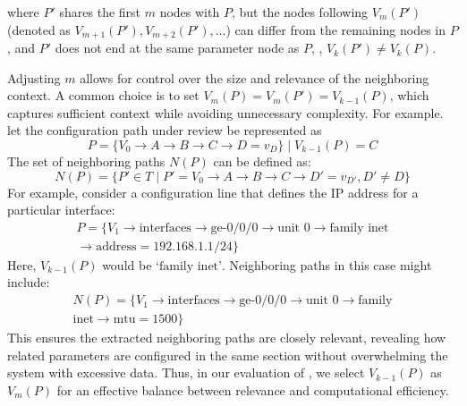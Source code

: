 where \( P' \) shares the first \( m \) nodes with \( P \), but the nodes following \( V_m(P') \) (denoted as \( V_{m+1}(P'), V_{m+2}(P'), \dots \)) can differ from the remaining nodes in \( P \), and 
\(P'\) does not end at the same parameter node as \(P\), \ie, \( V_k(P') \neq V_k(P) \).




Adjusting \( m \) allows for control over the size and relevance of the neighboring context.
A common choice is to set \(V_m(P) = V_m(P') = V_{k-1}(P) \), which captures sufficient context while avoiding unnecessary complexity. For example. let the configuration path under review be represented as
\[
P = \{V_0 \rightarrow A \rightarrow B \rightarrow C \rightarrow D = v_D \} \mid V_{k-1}(P) = C
\]
The set of neighboring paths \( N(P) \) can be defined as:
\[
N(P) = \{ P' \in T \mid P' = V_0 \rightarrow A \rightarrow B \rightarrow C \rightarrow D' = v_{D'}, D' \neq D \}
\]
For example, consider a configuration line that defines the IP address for a particular interface:
\begin{multline*}
P = \{V_1 \rightarrow \text{interfaces} \rightarrow \text{ge-0/0/0} 
\rightarrow \text{unit 0} \rightarrow \text{family inet}\\
\rightarrow \text{address} = 192.168.1.1/24 \}
\end{multline*}
Here, \(V_{k-1}(P)\) would be \( \text{`family inet'} \). Neighboring paths in this case might include:
\begin{multline*}
N(P) = \{V_1 \rightarrow \text{interfaces} \rightarrow \text{ge-0/0/0}
\rightarrow \text{unit 0} \rightarrow
\text{family}\\ \text{inet} \rightarrow \text{mtu} = 1500 \}
\end{multline*}
This ensures the extracted neighboring paths are closely relevant, revealing how related parameters are configured in the same section without overwhelming the system with excessive data. Thus, in our evaluation of \sysname{}, we select \(V_{k-1}(P)\) as  \( V_m(P) \) for an effective balance between relevance and computational efficiency.


